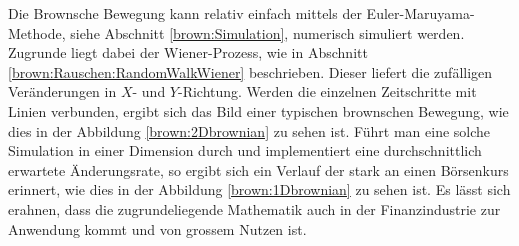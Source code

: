 Die Brownsche Bewegung kann relativ einfach mittels der Euler-Maruyama-Methode, siehe Abschnitt \ref{brown:Simulation}, numerisch simuliert werden. Zugrunde liegt dabei der Wiener-Prozess, wie in Abschnitt \ref{brown:Rauschen:RandomWalkWiener} beschrieben. Dieser liefert die zufälligen Veränderungen in $ X $- und $ Y $-Richtung. Werden die einzelnen Zeitschritte mit Linien verbunden, ergibt sich das Bild einer typischen brownschen Bewegung, wie dies in der Abbildung \ref{brown:2Dbrownian} zu sehen ist. Führt man eine solche Simulation in einer Dimension durch und implementiert eine durchschnittlich erwartete Änderungsrate, so ergibt sich ein Verlauf der stark an einen Börsenkurs erinnert, wie dies in der Abbildung \ref{brown:1Dbrownian} zu sehen ist. Es lässt sich erahnen, dass die zugrundeliegende Mathematik auch in der Finanzindustrie zur Anwendung kommt und von grossem Nutzen ist.

